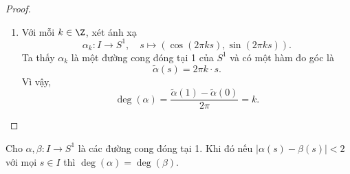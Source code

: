 \begin{proof}
\begin{enumerate}
			\[
			H(s,t) = (1 - t)\widetilde{\alpha}(s) + t\widetilde{\beta}(s).
			\]
			Ta có $H: \widetilde{\alpha}\simeq \widetilde{\beta}$. 
			Với mỗi $t \in I$, ta có
			\[
			H(1,t) - H(0,t) = (1 - t)\left[ \widetilde{\alpha}(1) - \widetilde{\alpha}(0) \right] + t\left[ \widetilde{\beta}(1) - \widetilde{\beta}(0) \right] = (1 - t)\cdot 2\pi  n + t \cdot 2\pi n = 2\pi n,
			\]
			với $n = \deg(\alpha) = \deg(\beta)$.
			Từ đó, bằng cách đặt $K = \xi \circ H$, kết hợp với $\xi: \R \to S^1$ là ánh xạ phủ, ta thu được ánh xạ liên tục $K: I \times I \to S^1$ thỏa mãn
			\begin{itemize}
				\item $K(s, 0) = \alpha(s)\quad \forall s\in I$.
				\item $K(s, 1) = \beta(s)\quad \forall s\in I$.
				\item $K(0, t) = K(1, t)=1\quad \forall t \in I$.
			\end{itemize}
			
			Vì vậy, $K$ là một phép đồng luân %
			từ $\alpha$ tới $\beta$. Hay $\alpha\simeq \beta$.
			
			
			\item %
			Với mỗi $k\in \Z$, xét ánh xạ%
			\[
			\alpha_k: I \to S^1,\quad  s\mapsto \left( \cos(2\pi ks), \sin(2\pi ks) \right).
			\]
			Ta thấy $\alpha_k$ là một đường cong đóng tại 1 của $S^1$ và có 
			một hàm đo góc là
			\[
			\widetilde{\alpha}(s) = 2\pi k \cdot s.
			\]
			Vì vậy, %
			\[
			\deg(\alpha) = \frac{\widetilde{\alpha}(1) - \widetilde{\alpha}(0)}{2\pi} = k.
			\]
		\end{enumerate}
	\end{proof}
	\begin{lemma}\label{doi.cuc}
		Cho $\alpha,\beta:I\to S^1$ là các đường cong đóng tại 1.
		Khi đó nếu $|\alpha(s)-\beta(s)|<2$ với mọi $s\in I$ thì $\deg (\alpha)=\deg (\beta)$.
	\end{lemma}
